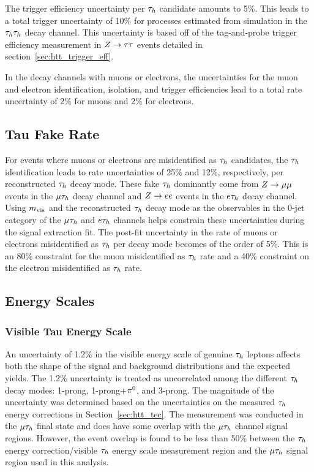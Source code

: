 The trigger efficiency uncertainty per $\tau_{h}$ candidate amounts to 5\%. This leads to a total 
trigger uncertainty of 10\% for processes estimated from simulation in the $\tau_{h}\tau_{h}$ decay channel. 
This uncertainty is based off of the tag-and-probe trigger efficiency measurement in 
$Z\to\tau\tau$ events detailed in section~\ref{sec:htt_trigger_eff}.

In the decay channels with muons or electrons, the uncertainties for the muon and electron identification, 
isolation, and trigger efficiencies lead to a total rate uncertainty of 2\% for muons and 2\% for electrons.


\subsection{Tau Fake Rate}
For events where muons or electrons are misidentified as $\tau_{h}$ candidates, the $\tau_{h}$ identification leads 
to rate uncertainties of 25\% and 12\%, respectively, per reconstructed $\tau_{h}$ decay mode. These fake $\tau_{h}$
dominantly come from $Z\to\mu\mu$ events in the $\mu\tau_{h}$ decay channel and $Z\to ee$ events 
in the $e\tau_{h}$ decay channel. Using $m_\text{vis}$ and the reconstructed 
$\tau_{h}$ decay mode as the observables in the 0-jet category of the $\mu\tau_{h}$ and $e\tau_{h}$ channels helps constrain these 
uncertainties during the signal extraction fit. The post-fit uncertainty in the rate of muons or electrons 
misidentified as $\tau_{h}$ per decay mode becomes of the order of 5\%. This is an 80\% constraint for the muon
misidentified as $\tau_{h}$ rate and a 40\% constraint on the electron misidentified as $\tau_{h}$ rate.


\subsection{Energy Scales}
\subsubsection{Visible Tau Energy Scale}
An uncertainty of 1.2\% in the visible energy scale of genuine $\tau_{h}$ leptons affects both the shape of the
signal and background distributions and the expected yields. The 1.2\% uncertainty is treated as uncorrelated 
among the different $\tau_{h}$ decay modes: 1-prong, 1-prong+$\pi^{0}$, and 3-prong.
The magnitude of the uncertainty was determined based on the uncertainties on the measured $\tau_{h}$ energy 
corrections in Section~\ref{sec:htt_tec}. The measurement was conducted in the $\mu\tau_{h}$ final state and
does have some overlap with the $\mu\tau_{h}$ channel signal regions. However, the event overlap is found to be
less than 50\% between the $\tau_{h}$ energy correction/visible $\tau_{h}$ energy scale measurement region and the
$\mu\tau_{h}$ signal region used in this analysis.

